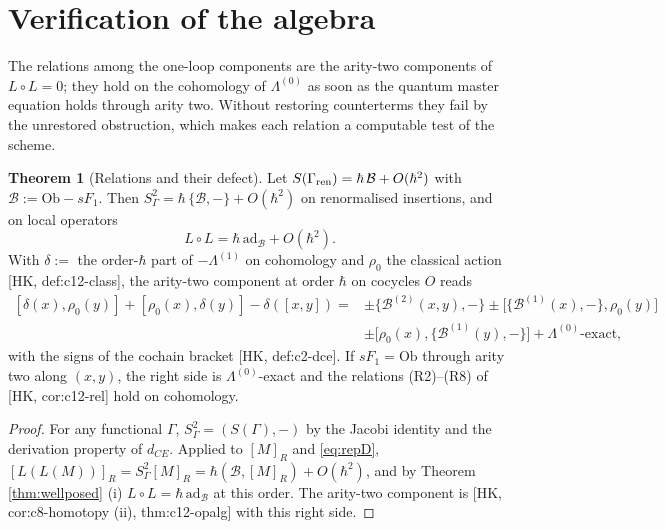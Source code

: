 \documentclass[11pt]{article}
\theoremstyle{definition}
\newtheorem{theorem}[definition]{Theorem}
\numberwithin{equation}{section}
\begin{document}
\section{Verification of the algebra}
\label{sec:alg}

The relations among the one-loop components are the arity-two components of $L\circ L=0$; they hold on the cohomology of $\Lambda^{(0)}$ as soon as the quantum master equation holds through arity two. Without restoring counterterms they fail by the unrestored obstruction, which makes each relation a computable test of the scheme.

\begin{theorem}[Relations and their defect]
\label{thm:rel}
Let $S(\Gamma_{\rm ren})=\hbar\,\mathcal B+O(\hbar^2)$ with $\mathcal B:=\mathrm{Ob}-sF_1$. Then $S_\Gamma^2=\hbar\,\{\mathcal B,-\}+O(\hbar^2)$ on renormalised insertions, and on local operators
\[
L\circ L=\hbar\,\mathrm{ad}_{\mathcal B}+O(\hbar^2).
\]
With $\delta:=$ the order-$\hbar$ part of $-\Lambda^{(1)}$ on cohomology and $\rho_0$ the classical action [HK, def:c12-class], the arity-two component at order $\hbar$ on cocycles $O$ reads
\begin{equation}
\begin{aligned}
[\delta(x),\rho_0(y)]+[\rho_0(x),\delta(y)]-\delta([x,y])={}&\pm\{\mathcal B^{(2)}(x,y),-\}\pm\big[\{\mathcal B^{(1)}(x),-\},\rho_0(y)\big]\\
&\pm\big[\rho_0(x),\{\mathcal B^{(1)}(y),-\}\big]+\Lambda^{(0)}\text{-exact},
\end{aligned}
\label{eq:reldefect}
\end{equation}
with the signs of the cochain bracket [HK, def:c2-dce]. If $sF_1=\mathrm{Ob}$ through arity two along $(x,y)$, the right side is $\Lambda^{(0)}$-exact and the relations (R2)--(R8) of [HK, cor:c12-rel] hold on cohomology.
\end{theorem}

\begin{proof}
For any functional $\Gamma$, $S_\Gamma^2=(S(\Gamma),-)$ by the Jacobi identity and the derivation property of $d_{CE}$. Applied to $[M]_R$ and \eqref{eq:repD}, $[L(L(M))]_R=S_\Gamma^2[M]_R=\hbar(\mathcal B,[M]_R)+O(\hbar^2)$, and by Theorem \ref{thm:wellposed} (i) $L\circ L=\hbar\,\mathrm{ad}_{\mathcal B}$ at this order. The arity-two component is [HK, cor:c8-homotopy (ii), thm:c12-opalg] with this right side.
\end{proof}
\end{document}

